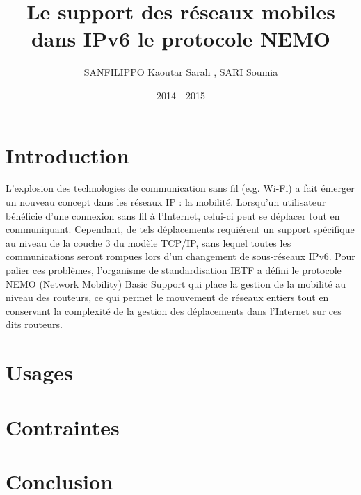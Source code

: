 \documentclass[a4paper]{article}
\title{Le support des r\'{e}seaux mobiles dans IPv6
           le protocole NEMO }
\author{SANFILIPPO Kaoutar Sarah , SARI Soumia}
\date{2014 - 2015}
\begin{document}
\maketitle
\newpage
\renewcommand{\contentsname}{Sommaire}
\tableofcontents

\newpage
\section{Introduction}

L'explosion des technologies de communication sans fil (e.g. Wi-Fi) a fait \'{e}merger un nouveau
concept dans les r\'{e}seaux IP : la mobilit\'{e}. Lorsqu'un utilisateur b\'{e}n\'{e}ficie d'une connexion sans fil \`a
l'Internet, celui-ci peut se d\'{e}placer tout en communiquant. Cependant, de tels d\'{e}placements
requi\'{e}rent un support sp\'{e}cifique au niveau de la couche 3 du mod\`{e}le TCP/IP, sans lequel toutes les
communications seront rompues lors d'un changement de sous-r\'{e}seaux IPv6. Pour palier ces
probl\`{e}mes, l'organisme de standardisation IETF a d\'{e}fini le protocole NEMO (Network Mobility) Basic
Support qui place la gestion de la mobilit\'{e} au niveau des routeurs, ce qui permet le mouvement de
r\'{e}seaux entiers tout en conservant la complexit\'{e} de la gestion des d\'{e}placements dans l'Internet sur
ces dits routeurs.

\section{Usages}
\section{Contraintes}
\section{Conclusion}
\end{document}
